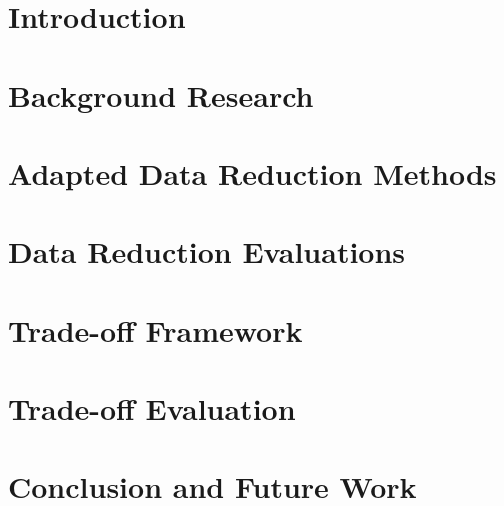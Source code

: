 \documentclass[msc,deptreport,dsti]{infthesis} %
\begin{document}
\chapter{Introduction}


\chapter{Background Research}
\label{bg}


\chapter{Adapted Data Reduction Methods}


\chapter{Data Reduction Evaluations}


\chapter{Trade-off Framework}


\chapter{Trade-off Evaluation}


\chapter{Conclusion and Future Work}






% 
% 
% 
\end{document}
